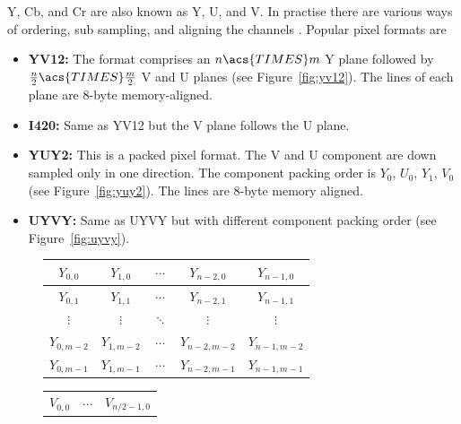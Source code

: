 \documentclass[12pt,a4paper,oneside,openright]{book}
\newcommand{\fig}[1]{Figure~\ref{fig:#1}}
\begin{document}
\begin{CJK}{UTF8}{}
\acs{Y}, \acs{Cb}, and \acs{Cr} are also known as \acs{Y}, \acs{U}, and \acs{V}. In practise there are various ways of ordering, sub sampling, and aligning the channels \citet{fourcc}. Popular pixel formats are
\begin{itemize}
\item \textbf{YV12:} The format comprises an $n\acs{TIMES} m$ \ac{Y} plane followed by $\frac{n}{2}\acs{TIMES}\frac{m}{2}$ \ac{V} and \ac{U} planes (see \fig{yv12}). The lines of each plane are 8-byte memory-aligned.
\item \textbf{I420:} Same as YV12 but the \ac{V} plane follows the \ac{U} plane.
\item \textbf{YUY2:} This is a packed pixel format. The \ac{V} and \ac{U} component are down sampled only in one direction. The component packing order is $Y_0$, $U_0$, $Y_1$, $V_0$ (see \fig{yuy2}). The lines are 8-byte memory aligned.
\item \textbf{UYVY:} Same as UYVY but with different component packing order (see \fig{uyvy}).
\end{itemize}
\begin{figure}[htbp]
  \begin{center}
    \begin{scriptsize}
      \begin{minipage}[c]{.39\textwidth}
        \begin{flushright}
          \begin{tabular}{|c|c|c|c|c|}\hline
            $Y_{0,0}$   & $Y_{1,0}$   & $\cdots$ & $Y_{n-2,0}$   & $Y_{n-1,0}$   \\\hline
            $Y_{0,1}$   & $Y_{1,1}$   & $\cdots$ & $Y_{n-2,1}$   & $Y_{n-1,1}$   \\\hline
            $\vdots$    & $\vdots$    & $\ddots$ & $\vdots$      & $\vdots$      \\\hline
            $Y_{0,m-2}$ & $Y_{1,m-2}$ & $\cdots$ & $Y_{n-2,m-2}$ & $Y_{n-1,m-2}$ \\\hline
            $Y_{0,m-1}$ & $Y_{1,m-1}$ & $\cdots$ & $Y_{n-2,m-1}$ & $Y_{n-1,m-1}$ \\\hline
          \end{tabular}
        \end{flushright}
      \end{minipage}
      \begin{minipage}[c]{.27\textwidth}
        \begin{center}
          \begin{tabular}{|c|c|c|c|c|}\hline
            \multicolumn{2}{|c|}{\multirow{2}{*}{$V_{0,0}$}} & $\cdots$ & \multicolumn{2}{|c|}{\multirow{2}{*}{$V_{n/2-1,0}$}} \\\cline{3-3}

\end{tabular}
\end{center}
\end{minipage}
\end{scriptsize}
\end{center}
\end{figure}
\end{CJK}
\end{document}
